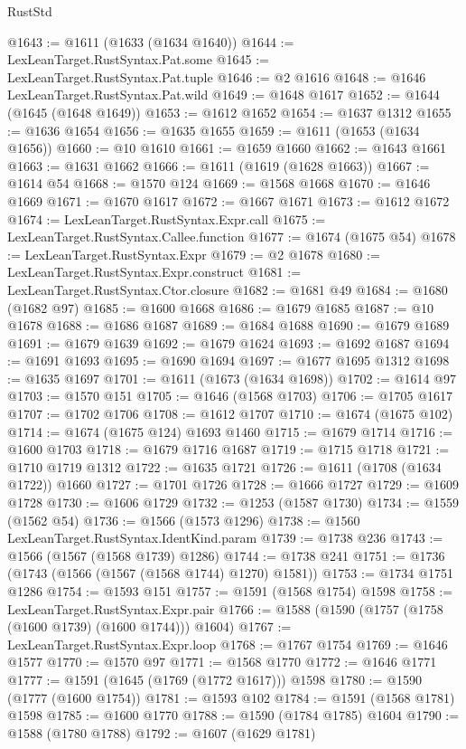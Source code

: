 \begin{lexlean}{RustStd}
\begin{coremodule}
@1643 := @1611 (@1633 (@1634 @1640))
@1644 := LexLeanTarget.RustSyntax.Pat.some
@1645 := LexLeanTarget.RustSyntax.Pat.tuple
@1646 := @2 @1616
@1648 := @1646 LexLeanTarget.RustSyntax.Pat.wild
@1649 := @1648 @1617
@1652 := @1644 (@1645 (@1648 @1649))
@1653 := @1612 @1652
@1654 := @1637 @1312
@1655 := @1636 @1654
@1656 := @1635 @1655
@1659 := @1611 (@1653 (@1634 @1656))
@1660 := @10 @1610
@1661 := @1659 @1660
@1662 := @1643 @1661
@1663 := @1631 @1662
@1666 := @1611 (@1619 (@1628 @1663))
@1667 := @1614 @54
@1668 := @1570 @124
@1669 := @1568 @1668
@1670 := @1646 @1669
@1671 := @1670 @1617
@1672 := @1667 @1671
@1673 := @1612 @1672
@1674 := LexLeanTarget.RustSyntax.Expr.call
@1675 := LexLeanTarget.RustSyntax.Callee.function
@1677 := @1674 (@1675 @54)
@1678 := LexLeanTarget.RustSyntax.Expr
@1679 := @2 @1678
@1680 := LexLeanTarget.RustSyntax.Expr.construct
@1681 := LexLeanTarget.RustSyntax.Ctor.closure
@1682 := @1681 @49
@1684 := @1680 (@1682 @97)
@1685 := @1600 @1668
@1686 := @1679 @1685
@1687 := @10 @1678
@1688 := @1686 @1687
@1689 := @1684 @1688
@1690 := @1679 @1689
@1691 := @1679 @1639
@1692 := @1679 @1624
@1693 := @1692 @1687
@1694 := @1691 @1693
@1695 := @1690 @1694
@1697 := @1677 @1695 @1312
@1698 := @1635 @1697
@1701 := @1611 (@1673 (@1634 @1698))
@1702 := @1614 @97
@1703 := @1570 @151
@1705 := @1646 (@1568 @1703)
@1706 := @1705 @1617
@1707 := @1702 @1706
@1708 := @1612 @1707
@1710 := @1674 (@1675 @102)
@1714 := @1674 (@1675 @124) @1693 @1460
@1715 := @1679 @1714
@1716 := @1600 @1703
@1718 := @1679 @1716 @1687
@1719 := @1715 @1718
@1721 := @1710 @1719 @1312
@1722 := @1635 @1721
@1726 := @1611 (@1708 (@1634 @1722)) @1660
@1727 := @1701 @1726
@1728 := @1666 @1727
@1729 := @1609 @1728
@1730 := @1606 @1729
@1732 := @1253 (@1587 @1730)
@1734 := @1559 (@1562 @54)
@1736 := @1566 (@1573 @1296)
@1738 := @1560 LexLeanTarget.RustSyntax.IdentKind.param
@1739 := @1738 @236
@1743 := @1566 (@1567 (@1568 @1739) @1286)
@1744 := @1738 @241
@1751 := @1736 (@1743 (@1566 (@1567 (@1568 @1744) @1270) @1581))
@1753 := @1734 @1751 @1286
@1754 := @1593 @151
@1757 := @1591 (@1568 @1754) @1598
@1758 := LexLeanTarget.RustSyntax.Expr.pair
@1766 := @1588 (@1590 (@1757 (@1758 (@1600 @1739) (@1600 @1744))) @1604)
@1767 := LexLeanTarget.RustSyntax.Expr.loop
@1768 := @1767 @1754
@1769 := @1646 @1577
@1770 := @1570 @97
@1771 := @1568 @1770
@1772 := @1646 @1771
@1777 := @1591 (@1645 (@1769 (@1772 @1617))) @1598
@1780 := @1590 (@1777 (@1600 @1754))
@1781 := @1593 @102
@1784 := @1591 (@1568 @1781) @1598
@1785 := @1600 @1770
@1788 := @1590 (@1784 @1785) @1604
@1790 := @1588 (@1780 @1788)
@1792 := @1607 (@1629 @1781)

\end{coremodule}
\end{lexlean}

